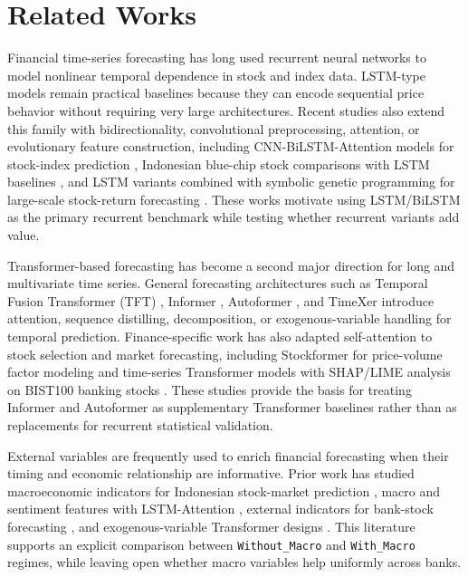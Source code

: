\section{Related Works}
Financial time-series forecasting has long used recurrent neural networks to model nonlinear temporal dependence in stock and index data. LSTM-type models remain practical baselines because they can encode sequential price behavior without requiring very large architectures. Recent studies also extend this family with bidirectionality, convolutional preprocessing, attention, or evolutionary feature construction, including CNN-BiLSTM-Attention models for stock-index prediction \cite{yang2024cnn_bilstm_attn}, Indonesian blue-chip stock comparisons with LSTM baselines \cite{saleh2025indonesian_lstm}, and LSTM variants combined with symbolic genetic programming for large-scale stock-return forecasting \cite{li2024sgp_lstm_stock}. These works motivate using LSTM/BiLSTM as the primary recurrent benchmark while testing whether recurrent variants add value.

Transformer-based forecasting has become a second major direction for long and multivariate time series. General forecasting architectures such as Temporal Fusion Transformer (TFT) \cite{lim2019tft}, Informer \cite{zhou2020informer}, Autoformer \cite{wu2021autoformer}, and TimeXer \cite{wang2024timexer} introduce attention, sequence distilling, decomposition, or exogenous-variable handling for temporal prediction. Finance-specific work has also adapted self-attention to stock selection and market forecasting, including Stockformer for price-volume factor modeling \cite{ma2024stockformer} and time-series Transformer models with SHAP/LIME analysis on BIST100 banking stocks \cite{calik2025xai_transformer_bist}. These studies provide the basis for treating Informer and Autoformer as supplementary Transformer baselines rather than as replacements for recurrent statistical validation.

External variables are frequently used to enrich financial forecasting when their timing and economic relationship are informative. Prior work has studied macroeconomic indicators for Indonesian stock-market prediction \cite{adyatma2022idx_macro}, macro and sentiment features with LSTM-Attention \cite{begum2024macro_sentiment_lstm}, external indicators for bank-stock forecasting \cite{dechjijaruwate2025thai_banks_external}, and exogenous-variable Transformer designs \cite{qiu2025dag_exogenous,wang2024timexer}. This literature supports an explicit comparison between \texttt{Without\_Macro} and \texttt{With\_Macro} regimes, while leaving open whether macro variables help uniformly across banks.

